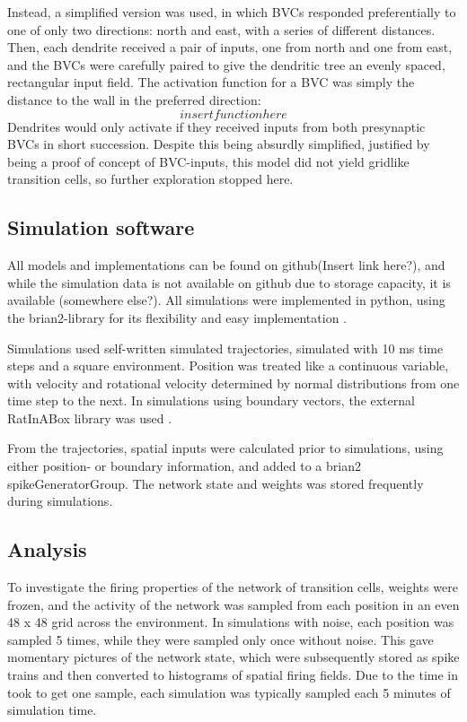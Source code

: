 \documentclass{article}
\begin{document}
    Instead, a simplified version was used, in which BVCs responded preferentially to one of only two directions: north and east, with a series of different distances. Then, each dendrite received a pair of inputs, one from north and one from east, and the BVCs were carefully paired to give the dendritic tree an evenly spaced, rectangular input field. The activation function for a BVC was simply the distance to the wall in the preferred direction:
    \[insert function here\]
    Dendrites would only activate if they received inputs from both presynaptic BVCs in short succession. Despite this being absurdly simplified, justified by being a proof of concept of BVC-inputs, this model did not yield gridlike transition cells, so further exploration stopped here.

    \subsection{Simulation software} All models and implementations can be found on github(Insert link here?), and while the simulation data is not available on github due to storage capacity, it is available (somewhere else?). All simulations were implemented in python, using the brian2-library for its flexibility and easy implementation \parencite{Brian2}. 
    
    Simulations used self-written simulated trajectories, simulated with 10 ms time steps and a square environment. Position was treated like a continuous variable, with velocity and rotational velocity determined by normal distributions from one time step to the next. In simulations using boundary vectors, the external RatInABox library was used \parencite{RatInABox}. 
    
    From the trajectories, spatial inputs were calculated prior to simulations, using either position- or boundary information, and added to a brian2 spikeGeneratorGroup. The network state and weights was stored frequently during simulations.

    \subsection{Analysis}
    To investigate the firing properties of the network of transition cells, weights were frozen, and the activity of the network was sampled from each position in an even 48 x 48 grid across the environment. In simulations with noise, each position was sampled 5 times, while they were sampled only once without noise. This gave momentary pictures of the network state, which were subsequently stored as spike trains and then converted to histograms of spatial firing fields. Due to the time in took to get one sample, each simulation was typically sampled each 5 minutes of simulation time.
\end{document}
